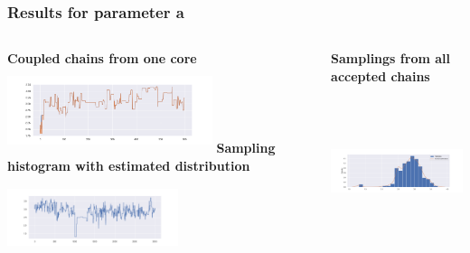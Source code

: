 \documentclass{beamer}
\begin{document}
\begin{frame}
	\frametitle{Results for parameter a}
	\begin{columns}
		\begin{column}{0.4\textwidth}
			{\scriptsize \textbf{Coupled chains from one core}}\\
			\includegraphics[width=6cm,height=2.5cm]{gk_all_pack/gk_all_chain_meeeting_0}
			\vspace{0.2cm}
			{\scriptsize \textbf{Sampling histogram with estimated distribution}}\\
			\includegraphics[width=5cm,height=2.5cm]{gk_all_pack/gk_all_sampling_0}
		\end{column}
		\begin{column}{0.4\textwidth}
			{	\scriptsize \textbf{Samplings from all accepted chains }}\\
			\includegraphics[width=6cm,height=5cm]{gk_all_pack/gk_all_histogram_kernel_0}
			
		\end{column}
	\end{columns}
	\end{frame}
\end{document}
